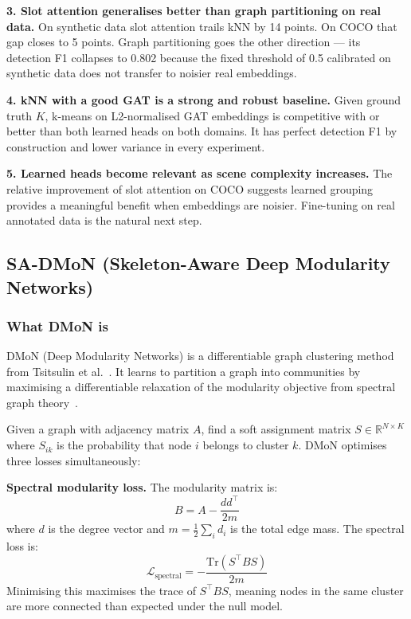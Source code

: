 \textbf{3. Slot attention generalises better than graph partitioning on real data.} On synthetic data slot attention trails kNN by 14 points. On COCO that gap closes to 5 points. Graph partitioning goes the other direction --- its detection F1 collapses to 0.802 because the fixed threshold of 0.5 calibrated on synthetic data does not transfer to noisier real embeddings.

\textbf{4. kNN with a good GAT is a strong and robust baseline.} Given ground truth $K$, k-means on L2-normalised GAT embeddings is competitive with or better than both learned heads on both domains. It has perfect detection F1 by construction and lower variance in every experiment.

\textbf{5. Learned heads become relevant as scene complexity increases.} The relative improvement of slot attention on COCO suggests learned grouping provides a meaningful benefit when embeddings are noisier. Fine-tuning on real annotated data is the natural next step.


\subsection{SA-DMoN (Skeleton-Aware Deep Modularity Networks)}

\subsubsection{What DMoN is}

DMoN (Deep Modularity Networks) is a differentiable graph clustering method from Tsitsulin et al.~\cite{tsitsulin2023dmon}. It learns to partition a graph into communities by maximising a differentiable relaxation of the modularity objective from spectral graph theory~\cite{vonluxburg2007spectral}.

Given a graph with adjacency matrix $A$, find a soft assignment matrix $S \in \mathbb{R}^{N \times K}$ where $S_{ik}$ is the probability that node $i$ belongs to cluster $k$. DMoN optimises three losses simultaneously:

\textbf{Spectral modularity loss.} The modularity matrix is:
\begin{equation}
B = A - \frac{dd^\top}{2m}
\end{equation}
where $d$ is the degree vector and $m = \frac{1}{2}\sum_i d_i$ is the total edge mass. The spectral loss is:
\begin{equation}
\mathcal{L}_{\text{spectral}} = -\frac{\text{Tr}(S^\top B S)}{2m}
\end{equation}
Minimising this maximises the trace of $S^\top B S$, meaning nodes in the same cluster are more connected than expected under the null model.

